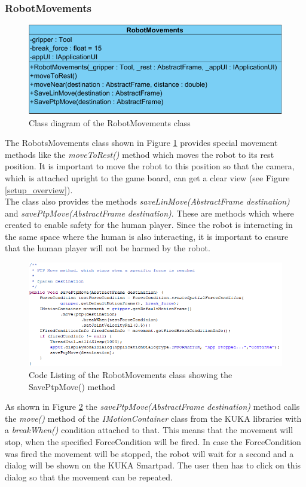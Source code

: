 \documentclass[a4paper]{spie}  %
\begin{document}
\begin{large}
\subsubsection{RobotMovements}
\begin{figure}[h]
\includegraphics[width=12cm]{images/class_roboMov.png}
\centering
\caption{Class diagram of the RobotMovements class}
\label{class_roboMov}
\end{figure}
The RobotsMovements class shown in Figure \ref{class_roboMov} provides special movement methods like the \emph{moveToRest()} method which moves the robot to its rest position. It is important to move the robot to this position so that the camera, which is attached upright to the game board, can get a clear view (see Figure \ref{setup_overview}). \\
The class also provides the methods \emph{saveLinMove(AbstractFrame destination)} and \emph{savePtpMove(AbstractFrame destination)}. These are methods which where  created to enable safety for the human player. Since the robot is interacting in the same space where the human is also interacting, it is important to ensure that the human player will not be harmed by the robot. \\
\begin{figure}[h]
\includegraphics[width=18cm]{images/code_safety.png}
\centering
\caption{Code Listing of the RobotMovements class showing the SavePtpMove() method}
\label{code_safety}
\end{figure}
As shown in Figure \ref{code_safety} the \emph{savePtpMove(AbstractFrame destination)} method calls the \emph{move()} method of the \emph{IMotionContainer} class from the KUKA libraries with a \textit{breakWhen()} condition attached to that. This means that the movement will stop, when the specified ForceCondition will be fired. In case the ForceCondition was fired the movement will be stopped, the robot will wait for a second and a dialog will be shown on the KUKA Smartpad. The user then has to click on this dialog so that the movement can be repeated.

\end{large}
\end{document}
